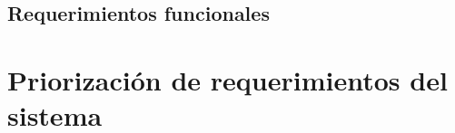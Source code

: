 \subsection{Requerimientos funcionales}
%
\newpage%
\section{Priorizaci\'on de requerimientos del sistema}

